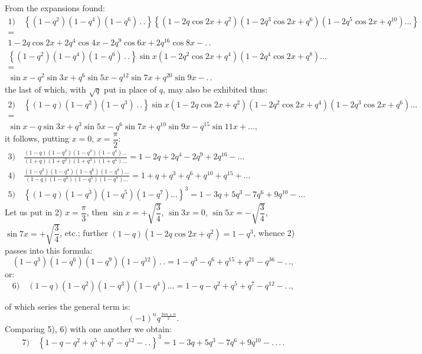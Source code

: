 \documentclass{article}
\begin{document}
From the expansions found:
\[
\begin{gathered}
\text{1)}\quad\left\{(1-q^{2})(1-q^{4})(1-q^{6})\,.\,.\right\}\left\{(1-2q\cos 2x+q^{2})(1-2q^{3}\cos 2x+q^{6})(1-2q^{5}\cos 2x+q^{10})\ldots\right\}\\[1ex]
=\\[1ex]
1-2q\cos 2x+2q^{4}\cos 4x-2q^{9}\cos 6x+2q^{16}\cos 8x-.\,.\\[1.5ex]
\left\{(1-q^{2})(1-q^{4})(1-q^{6})\,.\,.\right\}\sin x(1-2q^{2}\cos 2x+q^{4})(1-2q^{4}\cos 2x+q^{8})\ldots\\[1ex]
=\\[1ex]
\sin x-q^{2}\sin 3x+q^{6}\sin 5x-q^{12}\sin 7x+q^{20}\sin 9x-.\,.
\end{gathered}
\]
the last of which, with $\sqrt{q}$ put in place of $q$, may also be exhibited thus:
\[
\begin{gathered}
\text{2)}\quad\left\{(1-q)(1-q^{2})(1-q^{3})\,.\,.\right\}\sin x(1-2q\cos 2x+q^{2})(1-2q^{2}\cos 2x+q^{4})(1-2q^{3}\cos 2x+q^{6})\ldots\\[1ex]
=\\[1ex]
\sin x-q\sin 3x+q^{3}\sin 5x-q^{6}\sin 7x+q^{10}\sin 9x-q^{15}\sin 11x+\ldots,
\end{gathered}
\]
it follows, putting $x=0$, $x=\dfrac{\pi}{2}$:
\[
\begin{gathered}
\text{3)}\quad\frac{(1-q)(1-q^{2})(1-q^{3})(1-q^{4})\ldots}{(1+q)(1+q^{2})(1+q^{3})(1+q^{4})\ldots}=1-2q+2q^{4}-2q^{9}+2q^{16}-\ldots\\[2ex]
\text{4)}\quad\frac{(1-q^{2})(1-q^{4})(1-q^{6})(1-q^{8})\ldots}{(1-q)(1-q^{3})(1-q^{5})(1-q^{7})\ldots}=1+q+q^{3}+q^{6}+q^{10}+q^{15}+\ldots\\[2ex]
\text{5)}\quad\left\{(1-q)(1-q^{3})(1-q^{5})(1-q^{7})\ldots\right\}^{3}=1-3q+5q^{3}-7q^{6}+9q^{10}-\ldots
\end{gathered}
\]
Let us put in 2) $x=\dfrac{\pi}{3}$, then $\sin x=+\sqrt{\dfrac{3}{4}}$, $\sin 3x=0$, $\sin 5x=-\sqrt{\dfrac{3}{4}}$, $\sin 7x=+\sqrt{\dfrac{3}{4}}$, etc.; further $(1-q)(1-2q\cos 2x+q^{2})=1-q^{3}$, whence 2) passes into this formula:
\[
(1-q^{3})(1-q^{6})(1-q^{9})(1-q^{12})\,.\,.=1-q^{3}-q^{6}+q^{15}+q^{21}-q^{36}-.\,.,
\]
or:
\[
\text{6)}\quad(1-q)(1-q^{2})(1-q^{3})(1-q^{4})\ldots=1-q-q^{2}+q^{5}+q^{7}-q^{12}-.\,.,
\]

of which series the general term is:
\[
(-1)^{n}q^{\frac{3nn\pm n}{2}}.
\]
Comparing 5), 6) with one another we obtain:
\[
\text{7)}\quad\left\{1-q-q^{2}+q^{5}+q^{7}-q^{12}-.\,.\right\}^{3}=1-3q+5q^{3}-7q^{6}+9q^{10}-.\,.\,.\,.
\]
\end{document}
